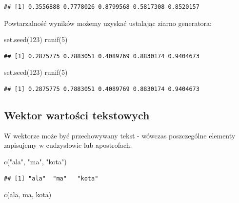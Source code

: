 \documentclass[
]{book}
\newenvironment{Shaded}{\begin{snugshade}}{\end{snugshade}}
\newcommand{\DecValTok}[1]{\textcolor[rgb]{0.00,0.00,0.81}{#1}}
\newcommand{\FunctionTok}[1]{\textcolor[rgb]{0.00,0.00,0.00}{#1}}
\newcommand{\NormalTok}[1]{#1}
\newcommand{\StringTok}[1]{\textcolor[rgb]{0.31,0.60,0.02}{#1}}
\begin{document}
\begin{verbatim}
## [1] 0.3556888 0.7778026 0.8799568 0.5817308 0.8520157
\end{verbatim}

Powtarzalność wyników możemy uzyskać ustalając ziarno generatora:

\begin{Shaded}
\begin{Highlighting}[]
\FunctionTok{set.seed}\NormalTok{(}\DecValTok{123}\NormalTok{)}
\FunctionTok{runif}\NormalTok{(}\DecValTok{5}\NormalTok{)}
\end{Highlighting}
\end{Shaded}

\begin{verbatim}
## [1] 0.2875775 0.7883051 0.4089769 0.8830174 0.9404673
\end{verbatim}

\begin{Shaded}
\begin{Highlighting}[]
\FunctionTok{set.seed}\NormalTok{(}\DecValTok{123}\NormalTok{)}
\FunctionTok{runif}\NormalTok{(}\DecValTok{5}\NormalTok{)}
\end{Highlighting}
\end{Shaded}

\begin{verbatim}
## [1] 0.2875775 0.7883051 0.4089769 0.8830174 0.9404673
\end{verbatim}

\hypertarget{wektor-wartoux15bci-tekstowych}{%
\subsection{Wektor wartości tekstowych}\label{wektor-wartoux15bci-tekstowych}}

W wektorze może być przechowywany tekst - wówczas poszczególne elementy zapisujemy w cudzysłowie lub apostrofach:

\begin{Shaded}
\begin{Highlighting}[]
\FunctionTok{c}\NormalTok{(}\StringTok{"ala"}\NormalTok{, }\StringTok{"ma"}\NormalTok{, }\StringTok{"kota"}\NormalTok{)}
\end{Highlighting}
\end{Shaded}

\begin{verbatim}
## [1] "ala"  "ma"   "kota"
\end{verbatim}

\begin{Shaded}
\begin{Highlighting}[]
\FunctionTok{c}\NormalTok{(}\StringTok{\textquotesingle{}ala\textquotesingle{}}\NormalTok{, }\StringTok{\textquotesingle{}ma\textquotesingle{}}\NormalTok{, }\StringTok{\textquotesingle{}kota\textquotesingle{}}\NormalTok{)}
\end{Highlighting}
\end{Shaded}
\end{document}
